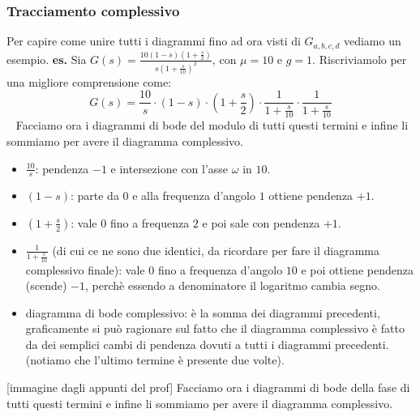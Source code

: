 \subsubsection{Tracciamento complessivo}
Per capire come unire tutti i diagrammi fino ad ora visti di $G_{a,b,c,d}$ vediamo un esempio. \newline
\newline
\textbf{es.} Sia $G(s) = \frac{10(1-s)(1+\frac{s}{2})}{s(1+ \frac{s}{10})^2}$, con $\mu=10$ e $g=1$. Riscriviamolo per una migliore comprensione come:
\[
    G(s) = \frac{10}{s} \cdot  (1-s) \cdot  (1+\frac{s}{2}) \cdot \frac{1}{1 + \frac{s}{10}} \cdot  \frac{1}{1+\frac{s}{10}}
\]
\ \newline
Facciamo ora i diagrammi di bode del modulo di tutti questi termini e infine li sommiamo per avere il diagramma complessivo.
\begin{itemize}
    \item $\frac{10}{s}$: pendenza $-1$ e intersezione con l'asse $\omega$ in $10$.
    \item $(1-s)$: parte da $0$ e alla frequenza d'angolo $1$ ottiene pendenza $+1$. 
    \item $(1+\frac{s}{2})$: vale $0$ fino a frequenza $2$ e poi sale con pendenza $+1$. 
    \item $\frac{1}{1 + \frac{s}{10}}$ (di cui ce ne sono due identici, da ricordare per fare il diagramma complessivo finale): vale $0$ fino a frequenza d'angolo $10$ e poi ottiene pendenza (scende) $-1$, perchè essendo a denominatore il logaritmo cambia segno.
    \item diagramma di bode complessivo: è la somma dei diagrammi precedenti, graficamente si può ragionare sul fatto che il diagramma complessivo è fatto da dei semplici cambi di pendenza dovuti a tutti i diagrammi precedenti. (notiamo che l'ultimo termine è presente due volte).
\end{itemize}
[immagine dagli appunti del prof]\newline
\newline
Facciamo ora i diagrammi di bode della fase di tutti questi termini e infine li sommiamo per avere il diagramma complessivo.

